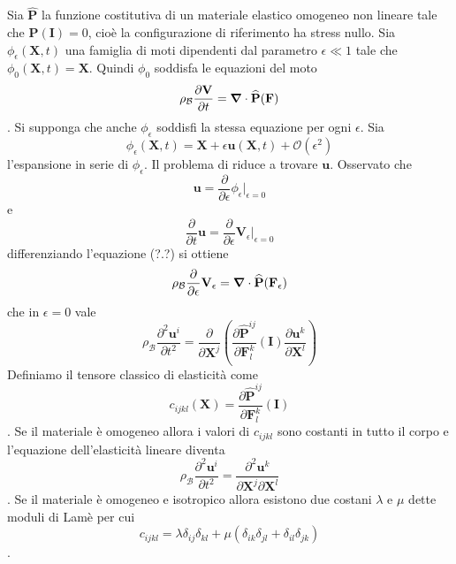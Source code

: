 Sia $\widehat{\mathbf{P}}$ la funzione costitutiva di un materiale elastico omogeneo non lineare tale che $\widehat{\mathbf{P}}(\mathbf{I})=0$, cioè la configurazione di riferimento ha stress nullo.
Sia $\phi_\epsilon(\mathbf{X},t)$ una famiglia di moti dipendenti dal parametro $\epsilon \ll1$ tale che $\phi_0(\mathbf{X},t) = \mathbf{X}$. Quindi $\phi_0$ soddisfa le equazioni del moto
$$\rho_\mathcal{B}\frac{\partial \mathbf{V}}{\partial t} = \boldsymbol{\nabla}\cdot\widehat{\mathbf{P}}(\mathbf{F}) $$.
Si supponga che anche $\phi_\epsilon$ soddisfi la stessa equazione per ogni $\epsilon$.
Sia 
$$\phi_\epsilon(\mathbf{X},t) = \mathbf{X}+\epsilon\mathbf{u}(\mathbf{X},t) + \mathcal{O}(\epsilon^2)$$
l'espansione in serie di $\phi_\epsilon$.
Il problema di riduce a trovare $\mathbf{u}$.
Osservato che 
$$\mathbf{u}=\frac{\partial}{\partial \epsilon}\phi_\epsilon \big|_{\epsilon=0}$$
e
$$\frac{\partial}{\partial t}\mathbf{u}=\frac{\partial}{\partial \epsilon}\mathbf{V}_\epsilon \big|_{\epsilon=0}$$
differenziando l'equazione (?.?) si ottiene
$$\rho_{\mathcal{B}} \frac{\partial}{\partial \epsilon}\mathbf{V}_\epsilon = \boldsymbol{\nabla}\cdot\widehat{\mathbf{P}}(\mathbf{F_\epsilon)}$$
che in $\epsilon=0$ vale
$$\rho_{\mathcal{B}} \frac{\partial^2\mathbf{u}^i}{\partial t^2} = \frac{\partial}{\partial \mathbf{X}^j}(\frac{\partial\widehat{\mathbf{P}}^{ij}}{\partial\mathbf{F}^k_l}(\mathbf{I})\frac{\partial\mathbf{u}^k}{\partial\mathbf{X}^l})$$
Definiamo il tensore classico di elasticità come
$$ c_{ijkl}(\mathbf{X})= \frac{\partial\widehat{\mathbf{P}}^{ij}}{\partial\mathbf{F}^k_l}(\mathbf{I})$$.
Se il materiale è omogeneo allora i valori di $c_{ijkl}$ sono costanti in tutto il corpo e l'equazione dell'elasticità lineare diventa
$$\rho_{\mathcal{B}} \frac{\partial^2\mathbf{u}^i}{\partial t^2} = \frac{\partial^2\mathbf{u}^k}{\partial\mathbf{X}^j\partial\mathbf{X}^l}$$.
Se il materiale è omogeneo e isotropico allora esistono due costani $\lambda$ e $\mu$ dette moduli di Lamè per cui
$$c_{ijkl}=\lambda\delta_{ij}\delta_{kl}+\mu(\delta_{ik}\delta_{jl}+\delta_{il}\delta_{jk})$$.

